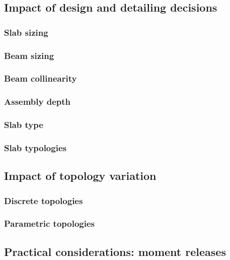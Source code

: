 \documentclass[10pt, letterpaper]{article} %
\begin{document}
    \subsection{Impact of design and detailing decisions}\label{sec:design-impacts}

    \subsubsection{Slab sizing}

    \subsubsection{Beam sizing}

    \subsubsection{Beam collinearity}

    \subsubsection{Assembly depth}

    \subsubsection{Slab type}

    \subsubsection{Slab typologies}

    \subsection{Impact of topology variation}

    \subsubsection{Discrete topologies}

    \subsubsection{Parametric topologies}\label{sec:parametric-topologies}

    \subsection{Practical considerations: moment releases}\label{sec:moment-releases}
\end{document}
